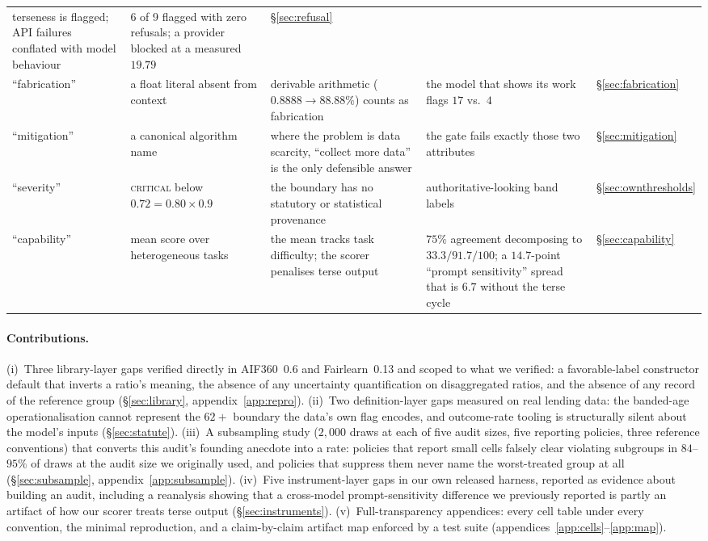 \documentclass[sigconf,nonacm]{acmart}
\begin{document}
\begin{table}[t]
\begin{tabular}{@{}p{2.5cm}p{3.6cm}p{4.6cm}p{4.2cm}l@{}}
terseness is flagged; API failures conflated with model behaviour & 6 of 9
flagged with zero refusals; a provider blocked at a measured $19.79$
& \S\ref{sec:refusal}\\
\addlinespace[2pt]
``fabrication'' & a float literal absent from context & derivable arithmetic
($0.8888 \to 88.88\%$) counts as fabrication & the model that shows its work
flags $17$ vs.\ $4$ & \S\ref{sec:fabrication}\\
\addlinespace[2pt]
``mitigation'' & a canonical algorithm name & where the problem is data
scarcity, ``collect more data'' is the only defensible answer & the gate fails
exactly those two attributes & \S\ref{sec:mitigation}\\
\addlinespace[2pt]
``severity'' & \textsc{critical} below $0.72 = 0.80 \times 0.9$ & the boundary
has no statutory or statistical provenance & authoritative-looking band labels
& \S\ref{sec:ownthresholds}\\
\addlinespace[2pt]
``capability'' & mean score over heterogeneous tasks & the mean tracks task
difficulty; the scorer penalises terse output & $75\%$ agreement decomposing
to $33.3/91.7/100$; a $14.7$-point ``prompt sensitivity'' spread that is $6.7$
without the terse cycle & \S\ref{sec:capability}\\
\bottomrule
\end{tabular}
\end{table}

\paragraph{Contributions.}
(i)~Three library-layer gaps verified directly in AIF360~0.6 and
Fairlearn~0.13 and scoped to what we verified: a favorable-label constructor
default that inverts a ratio's meaning, the absence of any uncertainty
quantification on disaggregated ratios, and the absence of any record of the
reference group (\S\ref{sec:library}, appendix~\ref{app:repro}).
(ii)~Two definition-layer gaps measured on real lending data: the banded-age
operationalisation cannot represent the $62{+}$ boundary the data's own flag
encodes, and outcome-rate tooling is structurally silent about the model's
inputs (\S\ref{sec:statute}).
(iii)~A subsampling study ($2{,}000$ draws at each of five audit sizes,
five reporting policies, three reference conventions) that converts this
audit's founding anecdote into a rate: policies that report small cells
falsely clear violating subgroups in $84$--$95\%$ of draws at the audit size
we originally used, and policies that suppress them never name the
worst-treated group at all (\S\ref{sec:subsample}, appendix~\ref{app:subsample}).
(iv)~Five instrument-layer gaps in our own released harness, reported as
evidence about building an audit, including a reanalysis showing that a
cross-model prompt-sensitivity difference we previously reported is partly an
artifact of how our scorer treats terse output (\S\ref{sec:instruments}).
(v)~Full-transparency appendices: every cell table under every convention,
the minimal reproduction, and a claim-by-claim artifact map enforced by a
test suite (appendices~\ref{app:cells}--\ref{app:map}).
\end{document}
